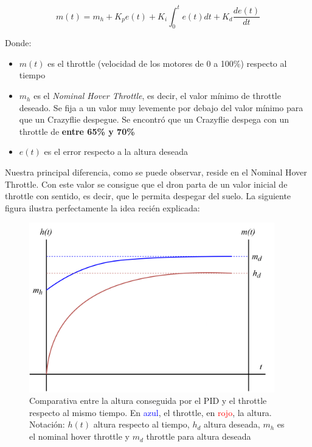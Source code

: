 \begin{equation}
    m(t) = m_h + K_p e(t) + K_i \int_{0}^{t} e(t)dt + K_d \frac{de(t)}{dt}
\end{equation}

Donde:

\begin{itemize}
    \item $m(t)$ es el throttle (velocidad de los motores de 0 a 100\%) respecto al tiempo
    \item $m_h$ es el \textit{Nominal Hover Throttle}, es decir, el valor mínimo de throttle deseado. 
    Se fija a un valor muy levemente por debajo del valor mínimo para que un Crazyflie despegue. 
    Se encontró que un Crazyflie despega con un throttle de \textbf{entre 65\% y 70\%}
    \item $e(t)$ es el error respecto a la altura deseada
\end{itemize}

Nuestra principal diferencia, como se puede observar, reside en el Nominal Hover Throttle. 
Con este valor se consigue que el dron parta de un valor inicial de throttle con sentido, 
es decir, que le permita despegar del suelo. 
La siguiente figura ilustra perfectamente la idea recién explicada:

\begin{figure}[h]
    \centering
    \includegraphics[width=0.95\textwidth]{img/fig/fig3.1-vertical-pid.png}
    \caption{Comparativa entre la altura conseguida por el PID y el throttle respecto al mismo tiempo. 
    En \textcolor{blue}{azul}, el throttle, en \textcolor{red}{rojo}, la altura.
    Notación: $h(t)$ altura respecto al tiempo, $h_d$ altura deseada, 
    $m_h$ es el nominal hover throttle y $m_d$ throttle para altura deseada}
    \label{fig:vertical-pid}
\end{figure}

